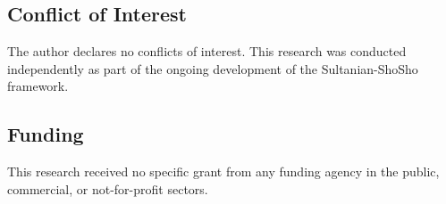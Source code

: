 \documentclass[11pt,a4paper]{article}
\begin{document}
\subsection*{Conflict of Interest}
The author declares no conflicts of interest. This research was conducted independently as part of the ongoing development of the Sultanian-ShoSho framework.

\subsection*{Funding}
This research received no specific grant from any funding agency in the public, commercial, or not-for-profit sectors.
\end{document}
